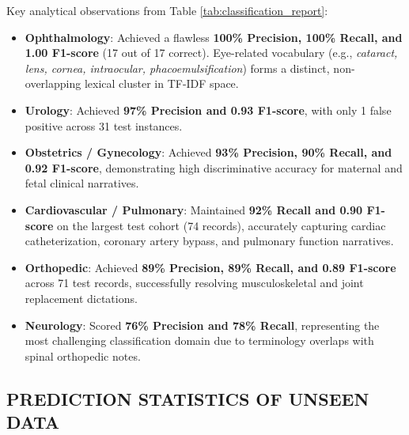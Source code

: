 Key analytical observations from Table \ref{tab:classification_report}:
\begin{itemize}
    \item \textbf{Ophthalmology}: Achieved a flawless \textbf{100\% Precision, 100\% Recall, and 1.00 F1-score} (17 out of 17 correct). Eye-related vocabulary (e.g., \textit{cataract, lens, cornea, intraocular, phacoemulsification}) forms a distinct, non-overlapping lexical cluster in TF-IDF space.
    \item \textbf{Urology}: Achieved \textbf{97\% Precision and 0.93 F1-score}, with only 1 false positive across 31 test instances.
    \item \textbf{Obstetrics / Gynecology}: Achieved \textbf{93\% Precision, 90\% Recall, and 0.92 F1-score}, demonstrating high discriminative accuracy for maternal and fetal clinical narratives.
    \item \textbf{Cardiovascular / Pulmonary}: Maintained \textbf{92\% Recall and 0.90 F1-score} on the largest test cohort (74 records), accurately capturing cardiac catheterization, coronary artery bypass, and pulmonary function narratives.
    \item \textbf{Orthopedic}: Achieved \textbf{89\% Precision, 89\% Recall, and 0.89 F1-score} across 71 test records, successfully resolving musculoskeletal and joint replacement dictations.
    \item \textbf{Neurology}: Scored \textbf{76\% Precision and 78\% Recall}, representing the most challenging classification domain due to terminology overlaps with spinal orthopedic notes.
\end{itemize}

\subsection{PREDICTION STATISTICS OF UNSEEN DATA}

